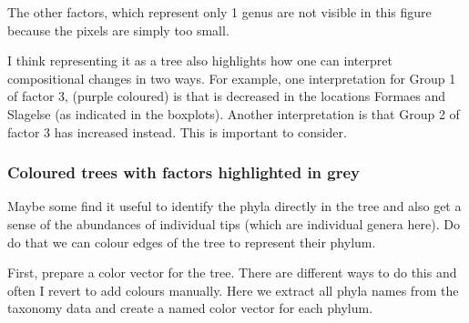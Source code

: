 \documentclass[
]{book}
\newenvironment{Shaded}{\begin{snugshade}}{\end{snugshade}}
\newcommand{\AttributeTok}[1]{\textcolor[rgb]{0.77,0.63,0.00}{#1}}
\newcommand{\CommentTok}[1]{\textcolor[rgb]{0.56,0.35,0.01}{\textit{#1}}}
\newcommand{\DecValTok}[1]{\textcolor[rgb]{0.00,0.00,0.81}{#1}}
\newcommand{\DocumentationTok}[1]{\textcolor[rgb]{0.56,0.35,0.01}{\textbf{\textit{#1}}}}
\newcommand{\FunctionTok}[1]{\textcolor[rgb]{0.00,0.00,0.00}{#1}}
\newcommand{\NormalTok}[1]{#1}
\newcommand{\OtherTok}[1]{\textcolor[rgb]{0.56,0.35,0.01}{#1}}
\newcommand{\SpecialCharTok}[1]{\textcolor[rgb]{0.00,0.00,0.00}{#1}}
\begin{document}
The other factors, which represent only 1 genus are not visible in this figure because the pixels are simply too small.

I think representing it as a tree also highlights how one can interpret compositional changes in two ways. For example, one interpretation for Group 1 of factor 3, (purple coloured) is that is decreased in the locations Formaes and Slagelse (as indicated in the boxplots). Another interpretation is that Group 2 of factor 3 has increased instead. This is important to consider.

\hypertarget{coloured-trees-with-factors-highlighted-in-grey}{%
\subsubsection{Coloured trees with factors highlighted in grey}\label{coloured-trees-with-factors-highlighted-in-grey}}

Maybe some find it useful to identify the phyla directly in the tree and also get a sense of the abundances of individual tips (which are individual genera here). Do do that we can colour edges of the tree to represent their phylum.

First, prepare a color vector for the tree. There are different ways to do this and often I revert to add colours manually. Here we extract all phyla names from the taxonomy data and create a named color vector for each phylum.

\begin{Shaded}
\end{Shaded}
\end{document}
